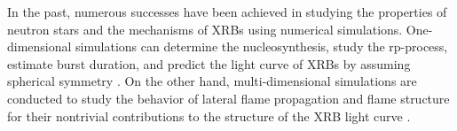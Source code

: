 \documentclass[preprint,times,tighten]{aastex631}
\newcommand{\MarginPar}[1]{
    \marginpar{\vskip-\baselineskip%
               \raggedright%
               \tiny\sffamily%
               {\color{red}\hrule%
               \smallskip%
               #1\par%
               \smallskip%
               \hrule}}%
}
\begin{document}

In the past, numerous successes have been achieved in studying the properties of neutron stars and the mechanisms of XRBs using numerical simulations.
One-dimensional simulations can determine the nucleosynthesis, study the rp-process, estimate burst duration, and predict the light curve of XRBs by assuming spherical symmetry \citep{Woosley_2004,Johnston_2018,Meisel_2018,Johnston_2020}. On the other hand, multi-dimensional simulations are conducted to study the behavior of lateral flame propagation and flame structure for their nontrivial contributions to the structure of the XRB light curve \citep{eiden:2020,harpole:2021,cavecchi:2013,Cavecchi_2015,Cavecchi_2016}.


\end{document}
